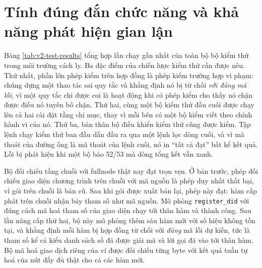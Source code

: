 \section{Tính đúng đắn chức năng và khả năng phát hiện gian lận}
\label{sec:dg-chuc-nang}



Bảng \ref{tab:v2-test-results} tổng hợp lần chạy gần nhất của toàn bộ bộ kiểm thử trong môi trường cách ly. Ba đặc điểm của chiến lược kiểm thử cần được nêu. Thứ nhất, phần lớn phép kiểm trên hợp đồng là phép kiểm trường hợp vi phạm: chúng dựng một thao tác sai quy tắc và khẳng định nó bị từ chối \emph{với đúng mã lỗi}, vì một quy tắc chỉ được coi là hoạt động khi có phép kiểm cho thấy nó chặn được điều nó tuyên bố chặn. Thứ hai, cùng một bộ kiểm thử đầu cuối được chạy lên cả hai cài đặt tầng chỉ mục, thay vì mỗi bên có một bộ kiểm viết theo chính hành vi của nó. Thứ ba, bản thân bộ điều khiển kiểm thử cũng được kiểm. Tập lệnh chạy kiểm thử ban đầu dẫn đầu ra qua một lệnh lọc dòng cuối, và vì mã thoát của đường ống là mã thoát của lệnh cuối, nó in ``tất cả đạt'' bất kể kết quả. Lỗi bị phát hiện khi một bộ báo 52/53 mà dòng tổng kết vẫn xanh.

Bộ đối chiếu tầng chuỗi với fullnode thật nay đạt trọn vẹn. Ở bản trước, phép đối chiếu giao diện chương trình trên chuỗi với mã nguồn là phép duy nhất thất bại, vì gói trên chuỗi là bản cũ. Sau khi gói được xuất bản lại, phép này đạt: hàm cấp phát trên chuỗi nhận bảy tham số như mã nguồn. Mô phỏng \texttt{register\_did} với đúng cách mã hoá tham số của giao diện chạy tới thân hàm và thành công. Sau lần nâng cấp thứ hai, bộ này mô phỏng thêm sáu hàm mới với số hiệu không tồn tại, và khẳng định mỗi hàm bị hợp đồng từ chối với \emph{đúng} mã lỗi dự kiến, tức là tham số kể cả kiểu danh sách số đã được giải mã và lời gọi đã vào tới thân hàm. Bộ mã hoá giao dịch riêng của ví được đối chiếu từng byte với kết quả tuần tự hoá của nút đầy đủ thật cho cả các hàm mới.

